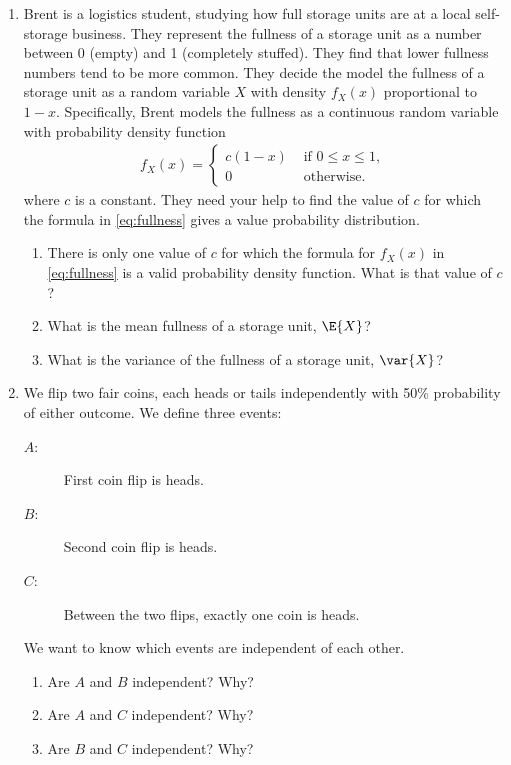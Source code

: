 \documentclass{article}
\begin{document}
\begin{enumerate}
    \item Brent is a logistics student, studying how full storage units are at a local self-storage business.
    They represent the fullness of a storage unit as a number between 0 (empty) and 1 (completely stuffed).
    They find that lower fullness numbers tend to be more common.
    They decide the model the fullness of a storage unit
    as a random variable $X$ with density $f_X(x)$ proportional to $1-x$.
    Specifically, Brent models the fullness as a continuous random variable with probability density function
    \begin{align}
        \label{eq:fullness}
        f_X(x) = \begin{cases}
            c(1-x) &\text{ if } 0 \le x \le 1, \\
            0 &\text{ otherwise.}
        \end{cases}
    \end{align}
    where $c$ is a constant. They need your help to find the value of $c$ for which the formula in \eqref{eq:fullness} gives a value probability distribution.
    \begin{enumerate}
        \item There is only one value of $c$ for which the formula for $f_X(x)$ in \eqref{eq:fullness} is a valid probability density function.
        What is that value of $c$?
        \item What is the mean fullness of a storage unit, $\E{X}$?
        \item What is the variance of the fullness of a storage unit, $\var{X}$?
    \end{enumerate}
    \item We flip two fair coins, each heads or tails independently with 50\% probability of either outcome.
    We define three events:
    \begin{description}
        \item[$A$:] First coin flip is heads.
        \item[$B$:] Second coin flip is heads.
        \item[$C$:] Between the two flips, exactly one coin is heads.
    \end{description}
    We want to know which events are independent of each other.
    \begin{enumerate}
        \item Are $A$ and $B$ independent? Why?
        \item Are $A$ and $C$ independent? Why?
        \item Are $B$ and $C$ independent? Why?

\end{enumerate}
\end{enumerate}
\end{document}
